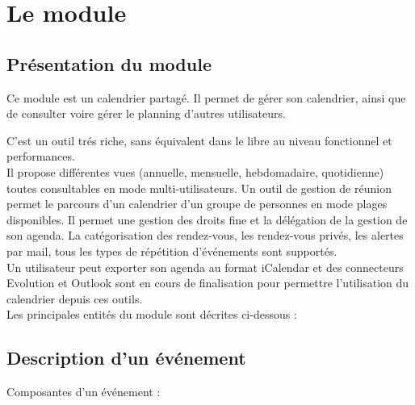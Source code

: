 
\clearpage
\section{Le module \agenda}

\subsection{Présentation du module \agenda}

Ce module est un calendrier partagé. Il permet de gérer son calendrier, ainsi que de consulter voire gérer le planning d'autres utilisateurs.

C'est un outil trés riche, sans équivalent dans le libre au niveau fonctionnel et performances.\\

Il propose différentes vues (annuelle, mensuelle, hebdomadaire, quotidienne) toutes consultables en mode multi-utilisateurs.
Un outil de gestion de réunion permet le parcours d'un calendrier d'un groupe de personnes en mode plages disponibles.
Il permet une gestion des droits fine et la délégation de la gestion de son agenda.
La catégorisation des rendez-vous, les rendez-vous privés, les alertes par mail, tous les types de répétition d'événements sont supportés.\\

Un utilisateur peut exporter son agenda au format iCalendar et des connecteurs Evolution et Outlook sont en cours de finalisation pour permettre l'utilisation du calendrier depuis ces outils.\\


Les principales entités du module \agenda sont décrites ci-dessous :

\subsection{Description d'un événement}

Composantes d'un événement :\\

